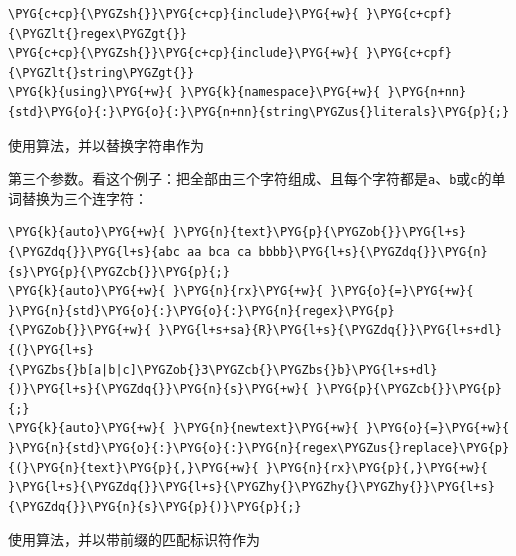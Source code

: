 
\begin{codeblockbg}
\begin{Verbatim}[commandchars=\\\{\},breaklines=true,breakanywhere=true,fontsize=\codefont,xleftmargin=17bp]
\PYG{c+cp}{\PYGZsh{}}\PYG{c+cp}{include}\PYG{+w}{ }\PYG{c+cpf}{\PYGZlt{}regex\PYGZgt{}}
\PYG{c+cp}{\PYGZsh{}}\PYG{c+cp}{include}\PYG{+w}{ }\PYG{c+cpf}{\PYGZlt{}string\PYGZgt{}}
\PYG{k}{using}\PYG{+w}{ }\PYG{k}{namespace}\PYG{+w}{ }\PYG{n+nn}{std}\PYG{o}{:}\PYG{o}{:}\PYG{n+nn}{string\PYGZus{}literals}\PYG{p}{;}
\end{Verbatim}
\end{codeblockbg}



使用算法，并以替换字符串作为



第三个参数。看这个例子：把全部由三个字符组成、且每个字符都是\texttt{a}、\texttt{b}或\texttt{c}的单词替换为三个连字符：



\begin{codeblockbg}
\begin{Verbatim}[commandchars=\\\{\},breaklines=true,breakanywhere=true,fontsize=\codefont,xleftmargin=17bp]
\PYG{k}{auto}\PYG{+w}{ }\PYG{n}{text}\PYG{p}{\PYGZob{}}\PYG{l+s}{\PYGZdq{}}\PYG{l+s}{abc aa bca ca bbbb}\PYG{l+s}{\PYGZdq{}}\PYG{n}{s}\PYG{p}{\PYGZcb{}}\PYG{p}{;}
\PYG{k}{auto}\PYG{+w}{ }\PYG{n}{rx}\PYG{+w}{ }\PYG{o}{=}\PYG{+w}{ }\PYG{n}{std}\PYG{o}{:}\PYG{o}{:}\PYG{n}{regex}\PYG{p}{\PYGZob{}}\PYG{+w}{ }\PYG{l+s+sa}{R}\PYG{l+s}{\PYGZdq{}}\PYG{l+s+dl}{(}\PYG{l+s}{\PYGZbs{}b[a|b|c]\PYGZob{}3\PYGZcb{}\PYGZbs{}b}\PYG{l+s+dl}{)}\PYG{l+s}{\PYGZdq{}}\PYG{n}{s}\PYG{+w}{ }\PYG{p}{\PYGZcb{}}\PYG{p}{;}
\PYG{k}{auto}\PYG{+w}{ }\PYG{n}{newtext}\PYG{+w}{ }\PYG{o}{=}\PYG{+w}{ }\PYG{n}{std}\PYG{o}{:}\PYG{o}{:}\PYG{n}{regex\PYGZus{}replace}\PYG{p}{(}\PYG{n}{text}\PYG{p}{,}\PYG{+w}{ }\PYG{n}{rx}\PYG{p}{,}\PYG{+w}{ }\PYG{l+s}{\PYGZdq{}}\PYG{l+s}{\PYGZhy{}\PYGZhy{}\PYGZhy{}}\PYG{l+s}{\PYGZdq{}}\PYG{n}{s}\PYG{p}{)}\PYG{p}{;}
\end{Verbatim}
\end{codeblockbg}



使用算法，并以带前缀的匹配标识符作为


